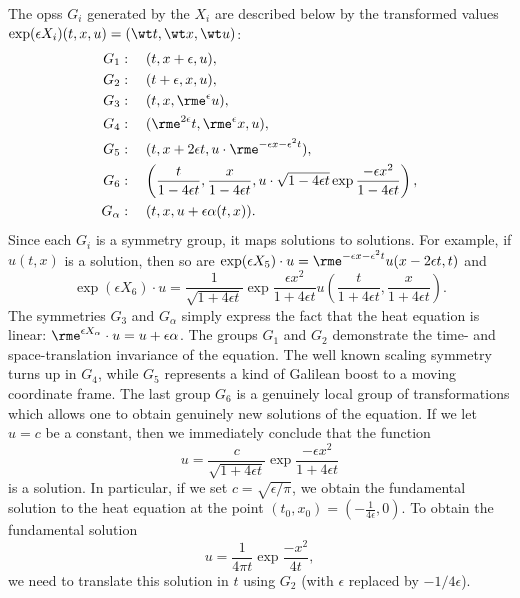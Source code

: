 \begin{example}
    The \glspl{ops} $G_i$ generated by the $X_i$ are described below by the transformed values $\exp(\epsilon X_i)(t,x,u)=(\wt t,\wt x,\wt u)$:
    \[\begin{split}
        G_1&:\quad (t,x+\epsilon,u),\\
        G_2&:\quad (t+\epsilon,x,u),\\
        G_3&:\quad (t,x,\rme^\epsilon u),\\
        G_4&:\quad (\rme^{2\epsilon}t,\rme^\epsilon x,u),\\
        G_5&:\quad (t,x+2\epsilon t,u\cdot \rme^{-\epsilon x-\epsilon^2 t}),\\
        G_6&:\quad \left(\frac{t}{1-4\epsilon t},\frac{x}{1-4\epsilon t},u\cdot \sqrt{1-4\epsilon t}\exp \frac{-\epsilon x^2}{1-4\epsilon t}\right),\\
        G_\alpha&:\quad (t,x,u+\epsilon \alpha(t,x)).\\
    \end{split}\]
    Since each $G_i$ is a symmetry group, it maps solutions to solutions. For example, if $u(t,x)$ is a solution, then so are $\exp(\epsilon X_5)\cdot u=\rme^{-\epsilon x-\epsilon^2 t}u(x-2\epsilon t,t)$ and 
    \[\exp(\epsilon X_6)\cdot u=\frac{1}{\sqrt{1+4\epsilon t}}\exp\frac{\epsilon x^2}{1+4\epsilon t}u\left(\frac{t}{1+4\epsilon t},\frac{x}{1+4\epsilon t}\right).\]
    The symmetries $G_3$ and $G_\alpha$ simply express the fact that the heat equation is linear: $\rme^{\epsilon X_\alpha}\cdot u=u+\epsilon\alpha$. The groups $G_1$ and $G_2$ demonstrate the time- and space-translation invariance of the equation. The well known scaling symmetry turns up in $G_4$, while $G_5$ represents a kind of Galilean boost to a moving coordinate frame. The last group $G_6$ is a genuinely local group of transformations which allows one to obtain genuinely new solutions of the equation. If we let $u=c$ be a constant, then we immediately conclude that the function 
    \[u=\frac{c}{\sqrt{1+4\epsilon t}}\exp\frac{-\epsilon x^2}{1+4\epsilon t}\]
    is a solution. In particular, if we set $c=\sqrt{\epsilon/\pi}$, we obtain the fundamental solution to the heat equation at the point $(t_0,x_0)=(-\frac{1}{4\epsilon},0)$. To obtain the fundamental solution 
    \[u=\frac{1}{4\pi t}\exp\frac{-x^2}{4t},\]
    we need to translate this solution in $t$ using $G_2$ (with $\epsilon$ replaced by $-1/4\epsilon$).
\end{example}


